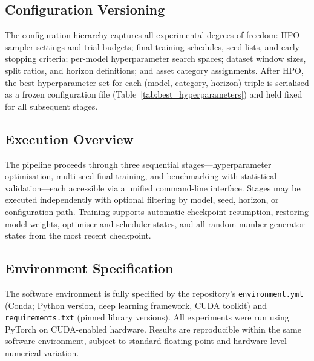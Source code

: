 \subsection{Configuration Versioning}
\label{sec:config_versioning}

The configuration hierarchy captures all experimental degrees of freedom: HPO sampler settings and trial budgets; final training schedules, seed lists, and early-stopping criteria; per-model hyperparameter search spaces; dataset window sizes, split ratios, and horizon definitions; and asset category assignments.  After HPO, the best hyperparameter set for each (model, category, horizon) triple is serialised as a frozen configuration file (Table~\ref{tab:best_hyperparameters}) and held fixed for all subsequent stages.

\subsection{Execution Overview}
\label{sec:execution}

The pipeline proceeds through three sequential stages---hyperparameter optimisation, multi-seed final training, and benchmarking with statistical validation---each accessible via a unified command-line interface.  Stages may be executed independently with optional filtering by model, seed, horizon, or configuration path.  Training supports automatic checkpoint resumption, restoring model weights, optimiser and scheduler states, and all random-number-generator states from the most recent checkpoint.

\subsection{Environment Specification}
\label{sec:environment}

The software environment is fully specified by the repository's \texttt{environment.yml} (Conda; Python version, deep learning framework, CUDA toolkit) and \texttt{requirements.txt} (pinned library versions).  All experiments were run using PyTorch \citep{Paszke2019} on CUDA-enabled hardware.  Results are reproducible within the same software environment, subject to standard floating-point and hardware-level numerical variation.

